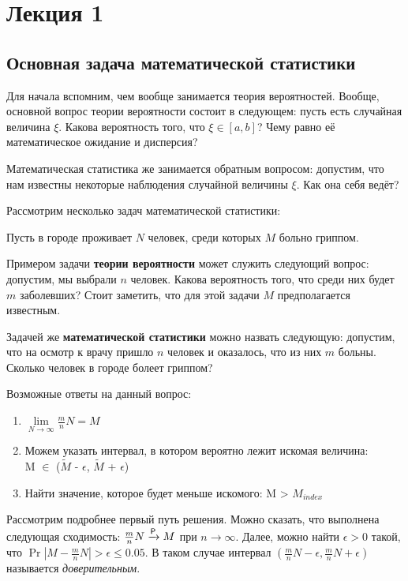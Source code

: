 \section{Лекция 1}

\subsection{Основная задача математической статистики}
Для начала вспомним, чем вообще занимается теория вероятностей. Вообще, 
основной вопрос теории вероятности состоит в следующем: пусть есть случайная 
величина \(\xi\). Какова вероятность того, что \(\xi \in [a, b]\)? Чему равно 
её математическое ожидание и дисперсия?

Математическая статистика же занимается обратным вопросом: допустим, что нам 
известны некоторые наблюдения случайной величины \(\xi\). Как она себя ведёт?

Рассмотрим несколько задач математической статистики:

\begin{example}
	Пусть в городе проживает \(N\) человек, среди которых \(M\) больно гриппом. 
	
	Примером задачи \textbf{теории вероятности} может служить следующий вопрос: 
	допустим, мы выбрали \(n\) человек. Какова вероятность того, что среди них 
	будет \(m\) заболевших? Стоит заметить, что для этой задачи \(M\) 
	предполагается известным.
	
	Задачей же \textbf{математической статистики} можно назвать следующую: 
	допустим, что на осмотр к врачу пришло \(n\) человек и оказалось, что из 
	них \(m\) больны. Сколько человек в городе болеет гриппом?
	
	Возможные ответы на данный вопрос:
    \begin{enumerate}
        \item $\lim\limits_{N \to \infty} \frac{m}{n}N = M$
        \item Можем указать интервал, в котором вероятно лежит искомая величина:\\ M $\in$ ($\tilde{M}$ - $\epsilon$, $\tilde{M}$ + $\epsilon$)
        \item Найти значение, которое будет меньше искомого: M > $M_{index}$
    \end{enumerate}
	
	Рассмотрим подробнее первый путь решения. Можно сказать, что выполнена следующая 
	сходимость: \(\frac{m}{n}N \xrightarrow{\mathsf{P}} M\) при \(n \to \infty\). Далее, можно 
	найти \(\epsilon > 0\) такой, что \(\Pr{|M - \frac{m}{n}N| >  \epsilon} 
	\leq 0.05\). В таком случае интервал \((\frac{m}{n}N - \epsilon,  
	\frac{m}{n}N + \epsilon)\) называется \emph{доверительным}.
\end{example}

